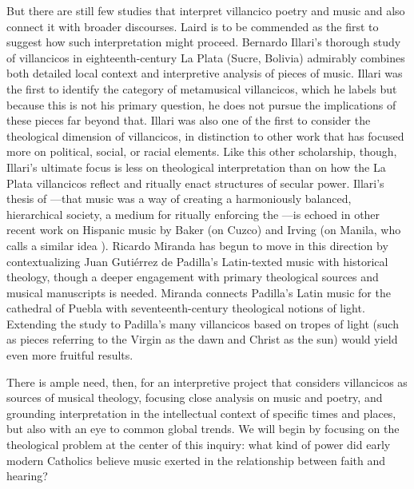 But there are still few studies that interpret villancico poetry and music and also connect it with broader discourses.
Laird is to be commended as the first to suggest how such interpretation might proceed.
Bernardo Illari's thorough study of villancicos in eighteenth-century La Plata (Sucre, Bolivia) admirably combines both detailed local context and interpretive analysis of pieces of music.%
	\autocites{Illari:Polychoral}{Illari:Popular}
Illari was the first to identify the category of metamusical villancicos, which he labels  but because this is not his primary question, he does not pursue the implications of these pieces far beyond that.
Illari was also one of the first to consider the theological dimension of villancicos, in distinction to other work that has focused more on political, social, or racial elements.
Like this other scholarship, though, Illari's ultimate focus is less on theological interpretation than on how the La Plata villancicos reflect and ritually enact structures of secular power.
Illari's thesis of ---that music was a way of creating a harmoniously balanced, hierarchical society, a medium for ritually enforcing the ---is echoed in other recent work on Hispanic music by Baker (on Cuzco) and Irving (on Manila, who calls a similar idea ).%
	\autocites{Baker:Harmony}{Irving:Colonial}
Ricardo Miranda has begun to move in this direction by contextualizing Juan Gutiérrez de Padilla's Latin-texted music with historical theology, though a deeper engagement with primary theological sources and musical manuscripts is needed.%
	\autocite{Miranda:PadillaLuz}
Miranda connects Padilla's Latin music for the cathedral of Puebla with seventeenth-century theological notions of light. 
Extending the study to Padilla's many villancicos based on tropes of light (such as pieces referring to the Virgin as the dawn and Christ as the sun) would yield even more fruitful results.

There is ample need, then, for an interpretive project that considers villancicos as sources of musical theology, focusing close analysis on music and poetry, and grounding interpretation in the intellectual context of specific times and places, but also with an eye to common global trends.
We will begin by focusing on the theological problem at the center of this inquiry: what kind of power did early modern Catholics believe music exerted in the relationship between faith and hearing?
